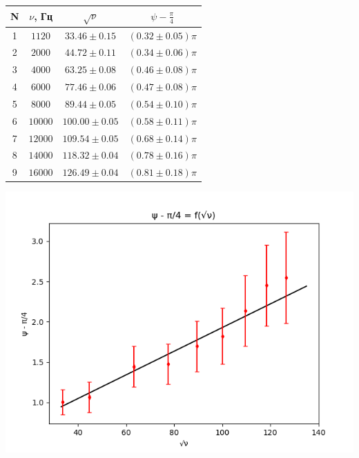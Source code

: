 \documentclass{article}
\begin{document}
\begin{center}
    \begin{tabular}{|c|c|c|c|}
        \hline
        N & $\nu$, Гц  & $ \sqrt{\nu}        $ & $\psi - \frac{\pi}{4}$ \\ \hline
        1  & $ 1120  $ & $ 33.46  \pm 0.15 $ & $ (0.32 \pm 0.05)\pi $ \\ \hline 
        2  & $ 2000  $ & $ 44.72  \pm 0.11 $ & $ (0.34 \pm 0.06)\pi $ \\ \hline 
        3  & $ 4000  $ & $ 63.25  \pm 0.08 $ & $ (0.46 \pm 0.08)\pi $ \\ \hline 
        4  & $ 6000  $ & $ 77.46  \pm 0.06 $ & $ (0.47 \pm 0.08)\pi $ \\ \hline 
        5  & $ 8000  $ & $ 89.44  \pm 0.05 $ & $ (0.54 \pm 0.10)\pi $ \\ \hline 
        6  & $ 10000 $ & $ 100.00 \pm 0.05 $ & $ (0.58 \pm 0.11)\pi $ \\ \hline 
        7  & $ 12000 $ & $ 109.54 \pm 0.05 $ & $ (0.68 \pm 0.14)\pi $ \\ \hline 
        8  & $ 14000 $ & $ 118.32 \pm 0.04 $ & $ (0.78 \pm 0.16)\pi $ \\ \hline 
        9  & $ 16000 $ & $ 126.49 \pm 0.04 $ & $ (0.81 \pm 0.18)\pi $ \\ \hline 
    \end{tabular}
\end{center}


\includegraphics[width=\linewidth]{psi.png}
\end{document}
